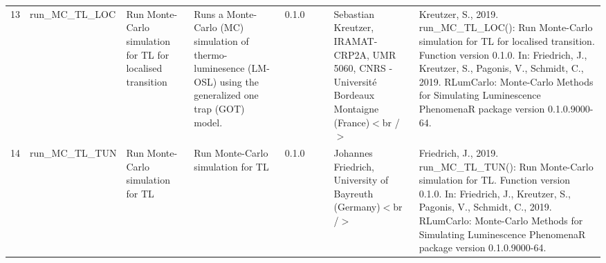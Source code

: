 \begin{table}[ht]
\begin{tabular}{rllllllll}
 \\ 
  13 & run\_MC\_TL\_LOC & Run Monte-Carlo simulation for TL for localised transition & Runs a Monte-Carlo (MC) simulation of thermo-luminesence (LM-OSL) using the generalized one trap (GOT) model. & 0.1.0
 &  &  & Sebastian Kreutzer, IRAMAT-CRP2A, UMR 5060, CNRS - Université Bordeaux Montaigne (France)$<$br /$>$ & Kreutzer, S., 2019. run\_MC\_TL\_LOC(): Run Monte-Carlo simulation for TL for localised transition. Function version 0.1.0. In: Friedrich, J., Kreutzer, S., Pagonis, V., Schmidt, C., 2019. RLumCarlo: Monte-Carlo Methods for Simulating Luminescence PhenomenaR package version 0.1.0.9000-64. 
 \\ 
  14 & run\_MC\_TL\_TUN & Run Monte-Carlo simulation for TL & Run Monte-Carlo simulation for TL & 0.1.0
 &  &  & Johannes Friedrich, University of Bayreuth (Germany)$<$br /$>$ & Friedrich, J., 2019. run\_MC\_TL\_TUN(): Run Monte-Carlo simulation for TL. Function version 0.1.0. In: Friedrich, J., Kreutzer, S., Pagonis, V., Schmidt, C., 2019. RLumCarlo: Monte-Carlo Methods for Simulating Luminescence PhenomenaR package version 0.1.0.9000-64. 
 \\ 
   \hline
\end{tabular}
\end{table}

